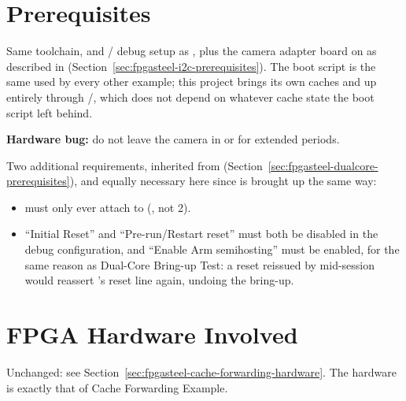 \section{Prerequisites}
\label{sec:fpgasteel-dualcore-forwarding-prerequisites}

Same toolchain,  and / debug setup as , plus the  camera adapter board on  as described in  (Section~\ref{sec:fpgasteel-i2c-prerequisites}). The boot script is the same  used by every other example; this project brings its own caches and  up entirely through /, which does not depend on whatever cache state the boot script left behind.

\begin{warningbox}
\textbf{Hardware bug:} do not leave the camera in  or  for extended periods.\footnotemark
\end{warningbox}

Two additional requirements, inherited from  (Section~\ref{sec:fpgasteel-dualcore-prerequisites}), and equally necessary here since  is brought up the same way:

\begin{itemize}
 \item {} must only ever attach to  (, not 2).
 \item ``Initial Reset'' and ``Pre-run/Restart reset'' must both be disabled in the debug configuration, and ``Enable Arm semihosting'' must be enabled, for the same reason as Dual-Core Bring-up Test: a reset reissued by  mid-session would reassert 's reset line again, undoing the bring-up.
\end{itemize}

\section{FPGA Hardware Involved}
\label{sec:fpgasteel-dualcore-forwarding-hardware}

Unchanged: see Section~\ref{sec:fpgasteel-cache-forwarding-hardware}. The hardware is exactly that of Cache Forwarding Example.


